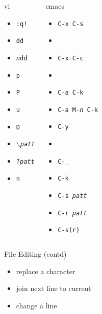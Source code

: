 \documentclass[slidestop,mathserif,compress,xcolor=svgnames]{beamer}
\newenvironment{eblock}[0]
{
\begin{beamerboxesrounded}[upper=uppercol2,lower=lowercol2,shadow=true]}
{\end{beamerboxesrounded}}
\begin{document}
\begin{frame}[allowframebreaks]
{\begin{columns}
\begin{eblock}{vi}
\begin{itemize}
      \item \texttt{:q!}
      \item \texttt{dd}
      \item \texttt{\textit{n}dd}
      \item \texttt{p}
      \item \texttt{P}
      \item \texttt{u}
      \item \texttt{D}
      \item \texttt{$\backslash$\textit{patt}}
      \item \texttt{?\textit{patt}}
      \item \texttt{n}
    \end{itemize}
    \end{eblock}
     \vspace{-0.5cm}
    \begin{eblock}{emacs}
    \begin{itemize}
      \item \texttt{C-x C-s}
      \item \texttt{}
      \item \texttt{C-x C-c}
      \item \texttt{}
      \item \texttt{C-a C-k}
      \item \texttt{C-a M-\textit{n} C-k}
      \item \texttt{C-y}
      \item
      \item \texttt{C-\_}
      \item \texttt{C-k}
      \item \texttt{C-s \textit{patt}}
      \item \texttt{C-r \textit{patt}}
      \item \texttt{C-s(r)}
    \end{itemize}
    \end{eblock}
  \end{columns}
  }
  \framebreak
  {\scriptsize
  \begin{columns}
     \vspace{-0.5cm}
    \begin{eblock}{File Editing (contd)}
    \begin{itemize}
      \item replace a character
      \item join next line to current
      \item change a line

\end{itemize}
\end{eblock}
\end{columns}}
\end{frame}
\end{document}
